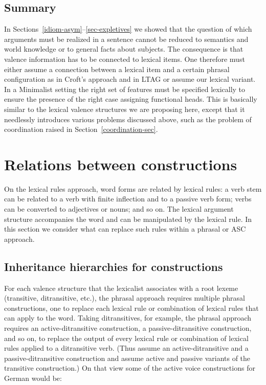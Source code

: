 \begin{exe}
\begin{xlist}[iv.]
\begin{exe}
\begin{xlist}[iv.]
\subsection{Summary}
\label{sec-underspec-summary}

In Sections~\ref{idiom-asym}--\ref{sec-expletives} we showed that the question of which
arguments must be realized in a sentence cannot be reduced to semantics and world knowledge or to
general facts about subjects. The consequence is that valence information has to be connected to
lexical items. One therefore must either assume a connection between a lexical item and a certain phrasal
configuration as in Croft's approach \citeyearpar{Croft2003a} and in LTAG or assume our lexical
variant. In a Minimalist setting the right set of features must be specified lexically to
ensure the presence of the right case assigning functional heads. This is basically %
similar to the lexical valence structures we are proposing here, except that it needlessly introduces  
various problems discussed above, such as the problem of coordination raised in Section~\ref{coordination-sec}. 

\section{Relations between constructions}
\label{relations-sec}

\largerpage
On the lexical rules approach, word forms are related by lexical rules: a verb
stem can be related to a verb with finite inflection and to a passive verb form; verbs can be converted
to adjectives or nouns; and so on.  The lexical argument structure accompanies the word and can be manipulated by the lexical rule.  
In this section we consider what can replace such rules within a phrasal or ASC approach.  



\subsection{Inheritance hierarchies for constructions}
\label{inheritance-sec}
\label{Abschnitt-Croft}


For each valence structure that the lexicalist associates with a root lexeme (transitive, ditransitive, etc.), 
the phrasal approach requires multiple phrasal constructions, one to replace each lexical rule or combination of lexical rules that can apply to the word.  
Taking ditransitives, for example, the phrasal approach requires an active-ditransitive construction, a passive-ditransitive construction, and 
so on, to replace the output of every lexical rule or combination of lexical rules applied to a ditransitive verb.  
(Thus  assume an active-ditransitive and a
passive-ditransitive construction and  assume active and passive
variants of the transitive construction.)  On that view some of the active voice constructions for German would be:


\end{xlist}
\end{exe}
\end{xlist}
\end{exe}
